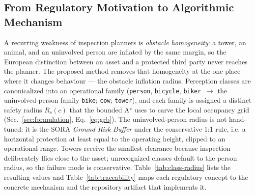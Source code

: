 
\subsection{From Regulatory Motivation to Algorithmic Mechanism}
\label{subsec:reg-operationalization}
A recurring weakness of inspection planners is \emph{obstacle homogeneity}: a
tower, an animal, and an uninvolved person are inflated by the same margin, so
the European distinction between an asset and a protected third party never
reaches the planner. The proposed method removes that homogeneity at the one
place where it changes behaviour --- the obstacle inflation radius. Perception
classes are canonicalized into an operational family (\texttt{person},
\texttt{bicycle}, \texttt{biker}~$\rightarrow$ the uninvolved-person family
\texttt{bike}; \texttt{cow}; \texttt{tower}), and each family is assigned a
distinct safety radius $R_s(c)$ that the bounded A$^\star$ uses to carve the
local occupancy grid (Sec.~\ref{sec:formulation}, Eq.~\eqref{eq:grb}). The
uninvolved-person radius is not hand-tuned: it is the SORA \emph{Ground Risk
Buffer} under the conservative 1:1 rule, i.e. a horizontal protection at least
equal to the operating height, clipped to an operational range. Towers receive
the smallest clearance because inspection deliberately flies close to the asset;
unrecognized classes default to the person radius, so the failure mode is
conservative. Table~\ref{tab:class-radius} lists the resulting values and
Table~\ref{tab:traceability} maps each regulatory concept to the concrete
mechanism and the repository artifact that implements it.

